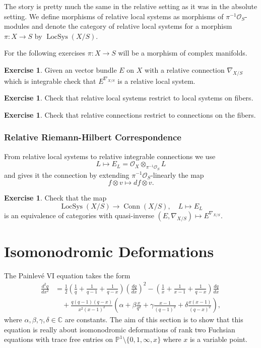 \documentclass[12pt]{book}
\numberwithin{equation}{section}
\theoremstyle{definition}
\newtheorem{exercise}[theorem]{Exercise}
\theoremstyle{remark}
\newcommand{\CC}{\mathbb{C}}
\newcommand{\PP}{\mathbb{P}}
\newcommand{\Ocal}{\mathcal{O}}
\newcommand{\LocSys}{\operatorname{LocSys}}
\newcommand{\Conn}{\operatorname{Conn}}
\begin{document}
The story is pretty much the same in the relative setting as it was in the absolute setting. 
We define morphisms of relative local systems as morphisms of $\pi^{-1}\Ocal_S$-modules and denote the category of relative local systems for a morphism $\pi:X \to S$ by $\LocSys(X/S)$.


For the following exercises $\pi:X\to S$ will be a morphism of complex manifolds. 
\begin{exercise}
	Given an vector bundle $E$ on $X$ with a relative connection $\nabla_{X/S}$ which is integrable check that $E^{\nabla_{X/S}}$ is a relative local system. 
\end{exercise}

\begin{exercise}
	Check that relative local systems restrict to local systems on fibers.
\end{exercise}

\begin{exercise}
	Check that relative connections restrict to connections on the fibers. 
\end{exercise}



\subsection{Relative Riemann-Hilbert Correspondence}
From relative local systems to relative integrable connections we use 
 $$ L \mapsto E_L = \Ocal_X\otimes_{\pi^{-1} \Ocal_S} L $$
and gives it the connection by extending $\pi^{-1}\Ocal_S$-linearly the map 
 $$ f \otimes v \mapsto df \otimes v.$$

\begin{exercise}
	Check that the map 
	$$\LocSys(X/S) \to \Conn(X/S), \quad L \mapsto E_L $$
	is an equivalence of categories with quasi-inverse $(E,\nabla_{X/S}) \mapsto E^{\nabla_{X/S}}$. 
\end{exercise}


\chapter{Isomonodromic Deformations}

The Painlev\'e VI equation takes the form
 \begin{align*}\frac{d^2q}{dx^2}&=
 \frac{1}{2}\left(\frac{1}{q}+\frac{1}{q-1}+\frac{1}{q-x}\right)\left( \frac{dq}{dx} \right)^2
 -\left(\frac{1}{x}+\frac{1}{x-1}+\frac{1}{q-x}\right)\frac{dq}{dx} \\&\quad +
 \frac{q(q-1)(q-x)}{x^2(x-1)^2}
 \left(\alpha+\beta\frac{x}{q^2}+\gamma\frac{x-1}{(q-1)^2}+\delta\frac{x(x-1)}{(q-x)^2}\right),
 \end{align*}
where $\alpha,\beta,\gamma,\delta \in \CC$ are constants.
The aim of this section is to show that this equation is really about isomonodromic deformations of rank two Fuchsian equations with trace free entries on $\PP^1\setminus \lbrace 0,1,\infty, x\rbrace$ where $x$ is a variable point.
\end{document}

